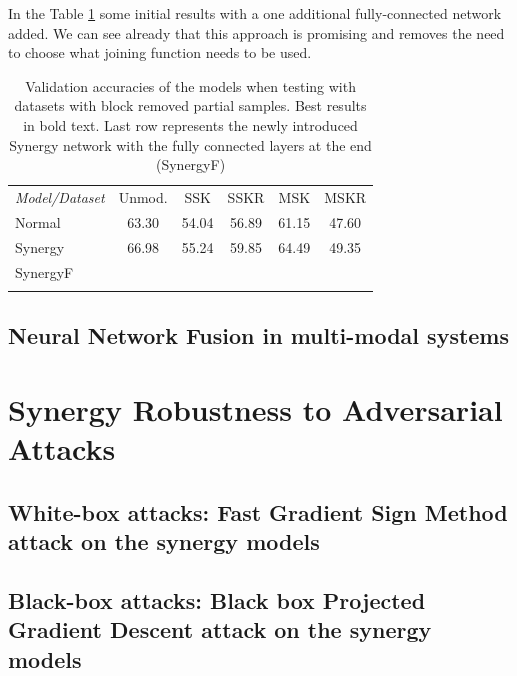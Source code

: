 \documentclass[b5paper]{book}
\begin{document}

In the Table \ref{tab:synergyfc} some initial results with a one additional fully-connected network added. We can see already that this approach is promising and removes the need to choose what joining function needs to be used.

\begin{table}
\centering
\caption{Validation accuracies of the models when testing with datasets with block removed partial samples. Best results in bold text. Last row represents the newly introduced Synergy network with the fully connected layers at the end (SynergyF)}
\label{tab:synergyfc}
\tabcolsep=0.06cm
\begin{tabular}{lccccc}
\hline\noalign{\smallskip}
\emph{Model/Dataset} & Unmod. & SSK & SSKR & MSK & MSKR \\
\noalign{\smallskip}\hline\noalign{\smallskip}
Normal & 63.30 & 54.04 & 56.89 & 61.15 & 47.60 \\
Synergy & 66.98 & 55.24 & 59.85 & 64.49 & 49.35 \\
SynergyF & \\
\noalign{\smallskip}\hline
\end{tabular}
\end{table}


\subsection{Neural Network Fusion in multi-modal systems}



\section{Synergy Robustness to Adversarial Attacks}

\subsection{White-box attacks: Fast Gradient Sign Method attack on the synergy models}


\subsection{Black-box attacks: Black box Projected Gradient Descent attack on the synergy models}

\end{document}
